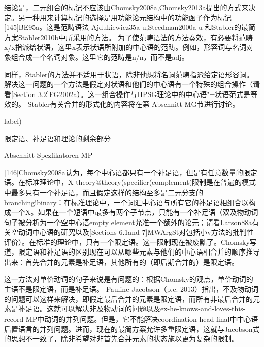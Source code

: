 结论是，二元组合的标记不应该由Chomsky2008a,Chomsky2013a提出的方式来决定。另一种用来计算标记的选择是用功能论元结构中的功能函子作为标记[145]BE95a。这是范畴语法 Ajdukiewicz35a-u,Steedman2000a-u 和Stabler的最简方案Stabler2010b中所采用的方法。 
为了使范畴语法的方法奏效，有必要将范畴x/x指派给状语，这里x表示状语所附加的中心语的范畴。例如，形容词与名词对象组合成一个名词对象。这里它的范畴是n/n，而不是adj。

同样，Stabler的方法并不适用于状语，除非他想将名词范畴指派给定语形容词。解决这一问题的一个方法是假定对状语和他们的中心语有一个特殊的组合操作（请看[Section 3.2]FG2002a）。这一组合操作与HPSG理论中的中心语"=状语范式是等效的。
 Stabler有关合并的形式化的内容将在第 Abschnitt-MG节进行讨论。
















label)


限定语、补足语和理论的剩余部分

Abschnitt-Spezfikatoren-MP

[146]Chomsky2008a认为，每个中心语都只有一个补足语，但是有任意数量的限定语。在标准理论中，X theory@theory(specifier(complement(限制是在普遍的模式中最多只有一个补足语，而且假定这样的结构至多是二元分支的branching!binary：在标准理论中，一个词汇中心语与所有它的补足语相组合以构成一个X。如果在一个短语中最多有两个子节点，只能有一个补足语（双及物动词句子被分析为一个空中心语empty element允准一个额外的论元；请看Larson88a有关空动词中心语的研究以及[Sections 6.1and 7]MWArgSt对包括小v方法的批判性评价）。在标准的理论中，只有一个限定语。这一限制现在被废黜了。Chomsky写道，限定语和补足语的区别现在可以从哪些元素与他们的中心语相合并的顺序推导出来：首先合并的元素是补足语，其他所有的（即后期合并的）是限定语。













这一方法对单价动词的句子来说是有问题的：根据Chomsky的观点，单价动词的主语不是限定语，而是补足语。 
Pauline Jacobson（p.c. 2013）指出，不及物动词的问题可以这样来解决，即假定最后合并的元素是限定语，而所有非最后合并的元素是补足语。这就可以解决非及物动词的问题以及ex-he-knows-and-loves-this-record-MP中动词的并列问题。但是，它不能解决coordination-head-final中中心语后置语言的并列问题。进而，现在的最简方案允许多重限定语，这就与Jacobson式的思想不一致了，除非希望对非首先合并元素的状态施以更为复杂的限制。






